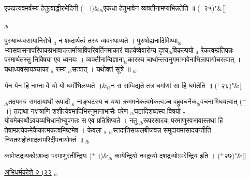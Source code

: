 \documentclass[article,12pt,a4paper]{memoir}%
\newcommand{\add}[1]{($^{+}$#1)}
\newcounter{parCount}
\begin{document}
	    
	    \stanza[\smallbreak]
	  एकप्रत्यवमर्षस्य हेतुत्वाद्धीरभेदिनी \add{।}&{\tiny $_{lb}$}एकधा हेतुभावेन व्यक्तीनामप्यभिन्नतेति ॥ \add{२५}{\normalfontlatin\large\qquad{}"}\&[\smallbreak]
	  
	  
	  
	  \endgroup
	{\tiny $_{lb}$}

	  
	  \pstart \leavevmode%
	पुरुषाध्यवसायानिरोधे {\tiny $_{3}$} न शब्दार्थत्वं तस्य व्यवस्थाप्यते । पुरुषोह्यनादिमिथ्या{\tiny $_{lb}$}भ्यासवासनापरिपाकप्रभावादन्तर्मात्राविपरिवर्तिनमाकारं बाहयेष्वेवारोप्य दृश्य{\tiny $_{lb}$}विकल्पयो {\tiny $_{4}$} रेकत्वम्प्रतिपन्नः परमार्थतस्तु निर्विषया एव ध्वनयः । व्यक्तीनाम्विज्ञाना{\tiny $_{lb}$}कारस्य चार्थान्तरानुगमाभावेनाभिलापागोचरत्वात् । यथाध्यवसायञ्चाका {\tiny $_{5}$} रस्य {\tiny $_{lb}$}सत्वात् । यथोक्तं {\color{DodgerBlue3}सूत्रे} ॥ {\tiny $_{lb}$} 
	    \pend%
	  
	    
	    \stanza[\smallbreak]
	  येन येन हि नाम्ना वै यो यो धर्मोभिलप्यते ।&{\tiny $_{lb}$}न स सम्विद्यते तत्र धर्माणां सा हि धर्मतेति ॥ \add{२६}{\normalfontlatin\large\qquad{}"}\&[\smallbreak]
	  
	  
	  
	    \pstart  \leavevmode%
	    \hphantom{.}
	   {\tiny $_{lb}$}तदयमत्र समदायार्थो रूपादी {\tiny $_{6}$} नाङ्घटस्य च यथा क्रममनेकत्वमेकत्वञ्च वहुवचनैक{\tiny $_{lb}$}वचनाभिधयत्वात् \add{।} तद्यथा नक्षत्राणि शशीत्येवमादिभिरनुमानाभासैः परेण {\tiny $_{lb}$}घटादिशब्दस्य विषयो {\tiny $_{7}$} योयमेकार्थोऽवयव्यभिधानोभ्युपगतः स एव प्रतिक्षिप्यते । नतु {\tiny $_{lb}$}रूपरसादयः परमाणुस्वभावास्तथा हि तेषाम्प्रत्येकमेकैकात्मकत्वमिष्टमेव । केवला {\tiny $_{8}$} {\tiny $_{lb}$}स्तदातिसफलबीजवन्न समुदायमासादयन्तीति नियतसहोत्पादत्वपरिदीपनायोक्तं ॥ {\tiny $_{lb}$} 
	    \pend%
	  
	    
	    \stanza[\smallbreak]
	  कामेष्टद्रव्यकोऽशब्दः परमाणुरतीन्द्रियः \add{।}&{\tiny $_{lb}$} \leavevmode{}कायेन्द्रियो नवद्रव्यो दशद्रव्योऽपरेन्द्रिय इति । \add{२७}{\normalfontlatin\large\qquad{}"}\&[\smallbreak]
	  
	  
	  
	    \pstart  \leavevmode%
	    \hphantom{.}
	  \href{http://sarit.indology.info/?cref=ak.2.22}{अभिधर्मकोशे २।२२}
	{}
	\pend%
      {\tiny $_{lb}$}
\end{document}
